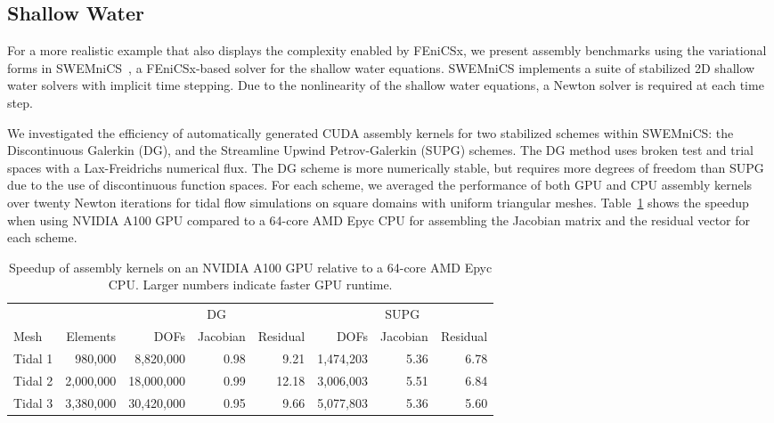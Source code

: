\subsection*{Shallow Water}
For a more realistic example that also displays the complexity enabled by FEniCSx, we present assembly benchmarks using the variational forms in SWEMniCS~\citep{dawson2024swemnics}, a FEniCSx-based solver for the shallow water equations. SWEMniCS implements a suite of stabilized 2D shallow water solvers with implicit time stepping. Due to the nonlinearity of the shallow water equations, a Newton solver is required at each time step.

We investigated the efficiency of automatically generated CUDA assembly kernels for two stabilized schemes within SWEMniCS: the Discontinuous Galerkin (DG), and the Streamline Upwind Petrov-Galerkin (SUPG) schemes. The DG method uses broken test and trial spaces with a Lax-Freidrichs numerical flux. The DG scheme is more numerically stable, but requires more degrees of freedom than SUPG due to the use of discontinuous function spaces. For each scheme, we averaged the performance of both GPU and CPU assembly kernels over twenty Newton iterations for tidal flow simulations on square domains with uniform triangular meshes. Table~\ref{tab:swe_a100_vs_epyc} shows the speedup when using NVIDIA A100 GPU compared to a 64-core AMD Epyc CPU for assembling the Jacobian matrix and the residual vector for each scheme.
\begin{table}[t]
    \centering
    \begin{tabular}{lrrrrrrr}
\toprule
        &           &           \multicolumn{3}{c}{DG} & \multicolumn{3}{c}{SUPG} \\
                                  \cmidrule(lr){3-5}       \cmidrule(lr){6-8}
Mesh    &  Elements &  DOFs & Jacobian & Residual  & DOFs  & Jacobian & Residual \\
\midrule
Tidal 1 &   980,000 &  8,820,000 &     0.98 &      9.21 &  1,474,203 &   5.36 &     6.78 \\
Tidal 2 & 2,000,000 & 18,000,000 &     0.99 &     12.18 &  3,006,003 &   5.51 &     6.84 \\
Tidal 3 & 3,380,000 & 30,420,000 &     0.95 &      9.66 &  5,077,803 &   5.36 &     5.60 \\
\bottomrule
\end{tabular}
    \caption{Speedup of assembly kernels on an NVIDIA A100 GPU relative to a 64-core AMD Epyc CPU. Larger numbers indicate faster GPU runtime.}
    \label{tab:swe_a100_vs_epyc}
\end{table}

